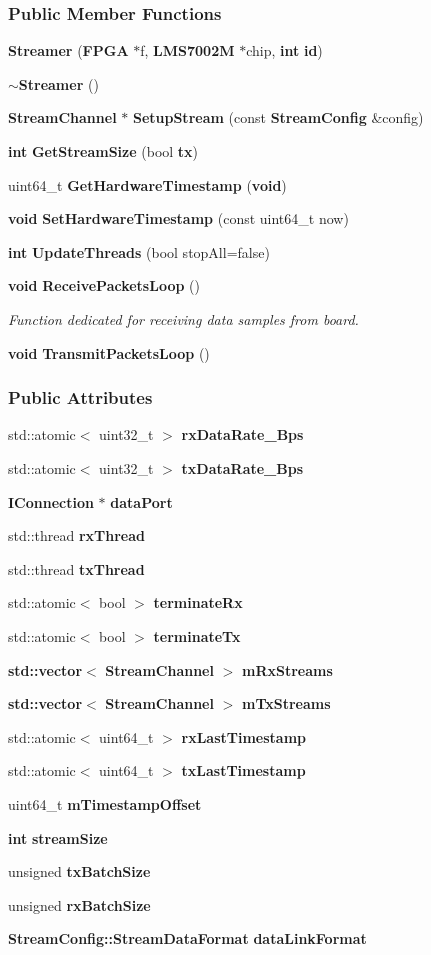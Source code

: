 \subsubsection*{Public Member Functions}
\begin{DoxyCompactItemize}
\item 
{\bf Streamer} ({\bf F\+P\+GA} $\ast$f, {\bf L\+M\+S7002M} $\ast$chip, {\bf int} {\bf id})
\item 
{\bf $\sim$\+Streamer} ()
\item 
{\bf Stream\+Channel} $\ast$ {\bf Setup\+Stream} (const {\bf Stream\+Config} \&config)
\item 
{\bf int} {\bf Get\+Stream\+Size} (bool {\bf tx})
\item 
uint64\+\_\+t {\bf Get\+Hardware\+Timestamp} ({\bf void})
\item 
{\bf void} {\bf Set\+Hardware\+Timestamp} (const uint64\+\_\+t now)
\item 
{\bf int} {\bf Update\+Threads} (bool stop\+All=false)
\item 
{\bf void} {\bf Receive\+Packets\+Loop} ()
\begin{DoxyCompactList}\small\item\em Function dedicated for receiving data samples from board. \end{DoxyCompactList}\item 
{\bf void} {\bf Transmit\+Packets\+Loop} ()
\end{DoxyCompactItemize}
\subsubsection*{Public Attributes}
\begin{DoxyCompactItemize}
\item 
std\+::atomic$<$ uint32\+\_\+t $>$ {\bf rx\+Data\+Rate\+\_\+\+Bps}
\item 
std\+::atomic$<$ uint32\+\_\+t $>$ {\bf tx\+Data\+Rate\+\_\+\+Bps}
\item 
{\bf I\+Connection} $\ast$ {\bf data\+Port}
\item 
std\+::thread {\bf rx\+Thread}
\item 
std\+::thread {\bf tx\+Thread}
\item 
std\+::atomic$<$ bool $>$ {\bf terminate\+Rx}
\item 
std\+::atomic$<$ bool $>$ {\bf terminate\+Tx}
\item 
{\bf std\+::vector}$<$ {\bf Stream\+Channel} $>$ {\bf m\+Rx\+Streams}
\item 
{\bf std\+::vector}$<$ {\bf Stream\+Channel} $>$ {\bf m\+Tx\+Streams}
\item 
std\+::atomic$<$ uint64\+\_\+t $>$ {\bf rx\+Last\+Timestamp}
\item 
std\+::atomic$<$ uint64\+\_\+t $>$ {\bf tx\+Last\+Timestamp}
\item 
uint64\+\_\+t {\bf m\+Timestamp\+Offset}
\item 
{\bf int} {\bf stream\+Size}
\item 
unsigned {\bf tx\+Batch\+Size}
\item 
unsigned {\bf rx\+Batch\+Size}
\item 
{\bf Stream\+Config\+::\+Stream\+Data\+Format} {\bf data\+Link\+Format}
\end{DoxyCompactItemize}
